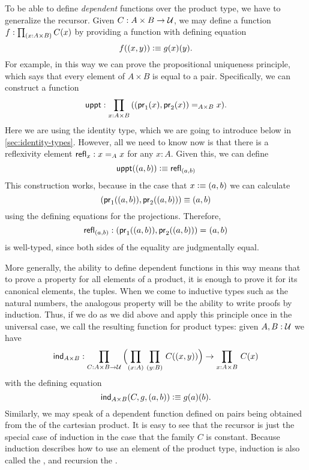 To be able to define \emph{dependent} functions over the product type, we have
to generalize the recursor. Given $C: A \times B \to \UU$, we may
define a function $f : \prd{x : A \times B} C(x)$ by providing a
function
with defining equation
\[ f(\tup x y) \defeq g(x)(y). \] 
For example, in this way we can prove the propositional uniqueness principle, which says that every element of $A\times B$ is equal to a pair.
%
Specifically, we can construct a function
\[ \uppt : \prd{x:A \times B} (\id[A\times B]{\tup{\fst {(x)}}{\snd {(x)}}}{x}). \]
Here we are using the identity type, which we are going to introduce below in \autoref{sec:identity-types}.
However, all we need to know now is that there is a reflexivity element $\refl{x} : \id[A]{x}{x}$ for any $x:A$.
Given this, we can define
\[ \uppt(\tup{a}{b}) \defeq \refl{\tup{a}{b}} \]
This construction works, because in the case that $x \defeq \tup{a}{b}$ we can 
calculate 
\[ \tup{\fst(\tup{a}{b})}{\snd{(\tup{a}{b})}} \jdeq \tup{a}{b} \]
using the defining equations for the projections. Therefore,
\[ \refl{\tup{a}{b}} : \id{\tup{\fst(\tup{a}{b})}{\snd{(\tup{a}{b})}}}{\tup{a}{b}} \]
is well-typed, since both sides of the equality are judgmentally equal.

More generally, the ability to define dependent functions in this way means that to prove a property for all elements of a product, it is enough 
to prove it for its canonical elements, the tuples.
When we come to inductive types such as the natural numbers, the analogous property will be the ability to write proofs by induction.
Thus, if we do as we did above and apply this principle once in the universal case, we call the resulting function  for product types: given $A,B : \UU$ we have
%
\[ \ind{A\times B} : \prd{C:A \times B \to \UU}
\Parens{\prd{x:A}{y:B} C(\tup{x}{y})} \to \prd{x:A \times B} C(x) \]
with the defining equation 
\[ \ind{A\times B}(C,g,\tup{a}{b}) \defeq g(a)(b). \]
Similarly, we may speak of a dependent function defined on pairs being obtained from the 
%
%
of the cartesian product.
It is easy to see that the recursor is just the special case of induction
in the case that the family $C$ is constant.
Because induction describes how to use an element of the product type, induction is also called the ,
%
and recursion the .
%
%
%


